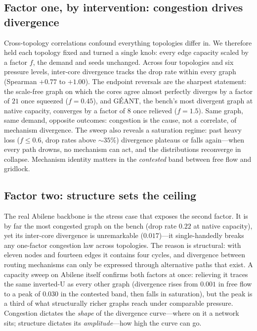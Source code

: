 \subsection{Factor one, by intervention: congestion drives divergence}
\label{sec:causal}

Cross-topology correlations confound everything topologies differ in. We
therefore held each topology fixed and turned a single knob: every edge
capacity scaled by a factor $f$, the demand and seeds unchanged. Across four
topologies and six pressure levels, inter-core divergence tracks the drop rate
within every graph (Spearman $+0.77$ to $+1.00$). The endpoint reversals are
the sharpest statement: the scale-free graph on which the cores agree almost
perfectly diverges by a factor of $21$ once squeezed ($f=0.45$), and G\'EANT,
the bench's most divergent graph at native capacity, converges by a factor of
$8$ once relieved ($f=1.5$). Same graph, same demand, opposite outcomes:
congestion is the cause, not a correlate, of mechanism divergence. The sweep
also reveals a saturation regime: past heavy loss ($f\le0.6$, drop rates above
$\sim35\%$) divergence plateaus or falls again---when every path drowns, no
mechanism can act, and the distributions reconverge in collapse. Mechanism
identity matters in the \emph{contested} band between free flow and gridlock.

\subsection{Factor two: structure sets the ceiling}
\label{sec:ceiling}

The real Abilene backbone is the stress case that exposes the second factor.
It is by far the most congested graph on the bench (drop rate $0.22$ at native
capacity), yet its inter-core divergence is unremarkable ($0.017$)---it
single-handedly breaks any one-factor congestion law across topologies. The
reason is structural: with eleven nodes and fourteen edges it contains four
cycles, and divergence between routing mechanisms can only be expressed
through alternative paths that exist. A capacity sweep on Abilene itself
confirms both factors at once: relieving it traces the same inverted-U as
every other graph (divergence rises from $0.001$ in free flow to a peak of
$0.030$ in the contested band, then falls in saturation), but the peak is a
third of what structurally richer graphs reach under comparable pressure.
Congestion dictates the \emph{shape} of the divergence curve---where on it a
network sits; structure dictates its \emph{amplitude}---how high the curve can
go.

